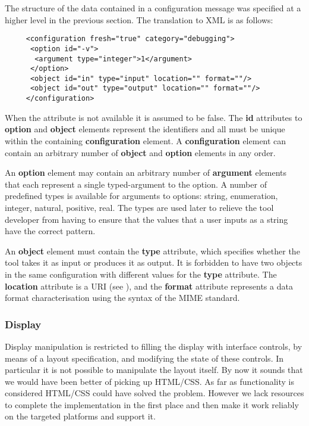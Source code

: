 \documentclass{article}
\begin{document}
   The structure of the data contained in a configuration message was specified
   at a higher level in the previous section. The translation to XML is as
   follows:

    \begin{verbatim}
     <configuration fresh="true" category="debugging">
      <option id="-v">
       <argument type="integer">1</argument>
      </option>
      <object id="in" type="input" location="" format=""/>
      <object id="out" type="output" location="" format=""/>
     </configuration>\end{verbatim}

   \noindent When the  attribute is not available it is assumed to
   be false. The \textbf{id} attributes to \textbf{option} and \textbf{object}
   elements represent the identifiers and all must be unique within the
   containing \textbf{configuration} element.  A \textbf{configuration} element
   can contain an arbitrary number of \textbf{object} and \textbf{option}
   elements in any order.

   An \textbf{option} element may contain an arbitrary number of
   \textbf{argument} elements that each represent a single typed-argument to the
   option. A number of predefined types is available for arguments to options:
   string, enumeration, integer, natural, positive, real. The types are used
   later to relieve the tool developer from having to ensure that the values that
   a user inputs as a string have the correct pattern.

   An \textbf{object} element must contain the \textbf{type} attribute, which
   specifies whether the tool takes it as input or produces it as output. It is
   forbidden to have two objects in the same configuration with different
   values for the \textbf{type} attribute. The \textbf{location} attribute is a
   URI (see \cite{rfc3305}), and the \textbf{format} attribute represents a data format
   characterisation using the syntax of the MIME standard.

  \subsubsection{Display}
   
   Display manipulation is restricted to filling the display with interface
   controls, by means of a layout specification, and modifying the state of
   these controls. In particular it is not possible to manipulate the layout
   itself. By now it sounds that we would have been better of picking up
   HTML/CSS. As far as functionality is considered HTML/CSS could have solved
   the problem. However we lack resources to complete the implementation in the
   first place and then make it work reliably on the targeted platforms and
   support it.
\end{document}
